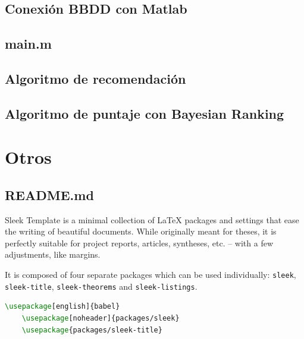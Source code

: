 \documentclass[a4paper, 12pt]{report}
\begin{document}
    \section{Conexión BBDD con Matlab}
    \section{main.m}
    \section{Algoritmo de recomendación}
    \section{Algoritmo de puntaje con Bayesian Ranking}

    \chapter{Otros}
    \section{README.md}
    \newpage


    Sleek Template is a minimal collection of \LaTeX{} packages and settings that ease the writing of beautiful documents. While originally meant for theses, it is perfectly suitable for project reports, articles, syntheses, etc. -- with a few adjustments, like margins.

    It is composed of four separate packages which can be used individually: \texttt{sleek}, \texttt{sleek-title}, \texttt{sleek-theorems} and \texttt{sleek-listings}.

    \begin{lstlisting}[style=ruled, language=latex, caption={Example of Sleek Template packages usage.}, gobble=4]
    \usepackage[english]{babel}
    \usepackage[noheader]{packages/sleek}
    \usepackage{packages/sleek-title}
    \end{lstlisting}

\end{document}
